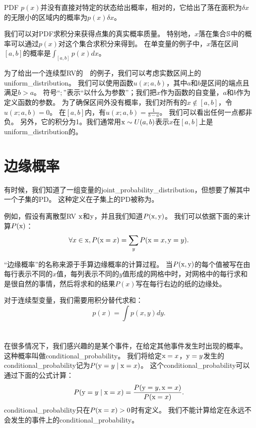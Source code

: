 \gls{PDF} $p(x)$并没有直接对特定的状态给出概率，相对的，它给出了落在面积为$\delta x$ 的无限小的区域内的概率为$p(x)\delta x$。

我们可以对\gls{PDF}求积分来获得点集的真实概率质量。
特别地，$x$落在集合$\mathbb{S}$中的概率可以通过$p(x)$对这个集合求积分来得到。
在单变量的例子中，$x$落在区间$[a, b]$的概率是$\int_{[a,b]} p(x)dx$。

为了给出一个连续型\gls{RV}的~~的例子，我们可以考虑实数区间上的\gls{uniform_distribution}。
我们可以使用函数$u(x; a, b)$，其中$a$和$b$是区间的端点且满足$b>a$。
符号``$;$''表示``以什么为参数''；我们把$x$作为函数的自变量，$a$和$b$作为定义函数的参数。
为了确保区间外没有概率，我们对所有的$x\not\in[a,b]$，令$u(x; a, b)=0$。
在$[a,b]$内，有$u(x; a, b)= \frac{1}{b-a}$。
我们可以看出任何一点都非负。
另外，它的积分为1。我们通常用$\mathrm{x} \sim U(a, b)$表示$x$在$[a, b]$上是\gls{uniform_distribution}的。

\section{边缘概率}
\label{sec:marginal_probability}

有时候，我们知道了一组变量的\gls{joint_probability_distribution}，但想要了解其中一个子集的\gls{PD}。
这种定义在子集上的\gls{PD}被称为。

例如，假设有离散型\gls{RV} $\mathrm{x}$和$\mathrm{y}$，并且我们知道$P(\mathrm{x}, \mathrm{y})$。
我们可以依据下面的来计算$P(\mathrm{x})$：
\begin{equation}
\forall x \in \mathrm{x}, P(\mathrm{x} = x) = \sum_y P(\mathrm{x} = x, \mathrm{y} = y).
\end{equation}


``边缘概率''的名称来源于手算边缘概率的计算过程。
当$P(\mathrm{x}, \mathrm{y})$的每个值被写在由每行表示不同的$x$值，每列表示不同的$y$值形成的网格中时，对网格中的每行求和是很自然的事情，然后将求和的结果$P(x)$写在每行右边的纸的边缘处。

对于连续型变量，我们需要用积分替代求和：
\begin{equation}
p(x) = \int p(x, y)dy.
\end{equation}

\section{}
\label{sec:conditional_probability}

在很多情况下，我们感兴趣的是某个事件，在给定其他事件发生时出现的概率。
这种概率叫做\gls{conditional_probability}。
我们将给定$\mathrm{x} = x$，$\mathrm{y} = y$发生的\gls{conditional_probability}记为$P(\mathrm{y} = y\mid \mathrm{x} =x)$。
这个\gls{conditional_probability}可以通过下面的公式计算：
\begin{equation}
P(\mathrm{y} = y\mid \mathrm{x} = x) = \frac{P(\mathrm{y} = y, \mathrm{x} = x)}{P(\mathrm{x} = x)} .
\label{eq:3.5}
\end{equation}
\gls{conditional_probability}只在$P(\mathrm{x} = x)>0$时有定义。
我们不能计算给定在永远不会发生的事件上的\gls{conditional_probability}。


